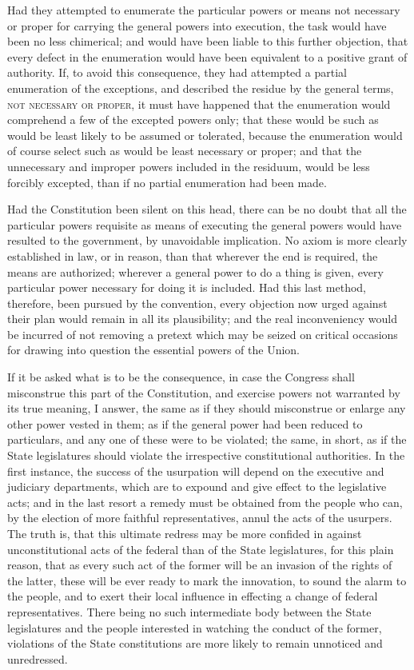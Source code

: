 Had they attempted to enumerate the particular powers or means not necessary or proper for carrying the general powers into execution, the task would have been no less chimerical; and would have been liable to this further objection, that every defect in the enumeration would have been equivalent to a positive grant of authority. 
If, to avoid this consequence, they had attempted a partial enumeration of the exceptions, and described the residue by the general terms, \textsc{not necessary or proper}, it must have happened that the enumeration would comprehend a few of the excepted powers only; that these would be such as would be least likely to be assumed or tolerated, because the enumeration would of course select such as would be least necessary or proper; and that the unnecessary and improper powers included in the residuum, would be less forcibly excepted, than if no partial enumeration had been made.

Had the Constitution been silent on this head, there can be no doubt that all the particular powers requisite as means of executing the general powers would have resulted to the government, by unavoidable implication. 
No axiom is more clearly established in law, or in reason, than that wherever the end is required, the means are authorized; wherever a general power to do a thing is given, every particular power necessary for doing it is included. 
Had this last method, therefore, been pursued by the convention, every objection now urged against their plan would remain in all its plausibility; and the real inconveniency would be incurred of not removing a pretext which may be seized on critical occasions for drawing into question the essential powers of the Union.

If it be asked what is to be the consequence, in case the Congress shall misconstrue this part of the Constitution, and exercise powers not warranted by its true meaning, I answer, the same as if they should misconstrue or enlarge any other power vested in them; as if the general power had been reduced to particulars, and any one of these were to be violated; the same, in short, as if the State legislatures should violate the irrespective constitutional authorities. 
In the first instance, the success of the usurpation will depend on the executive and judiciary departments, which are to expound and give effect to the legislative acts; and in the last resort a remedy must be obtained from the people who can, by the election of more faithful representatives, annul the acts of the usurpers. 
The truth is, that this ultimate redress may be more confided in against unconstitutional acts of the federal than of the State legislatures, for this plain reason, that as every such act of the former will be an invasion of the rights of the latter, these will be ever ready to mark the innovation, to sound the alarm to the people, and to exert their local influence in effecting a change of federal representatives. 
There being no such intermediate body between the State legislatures and the people interested in watching the conduct of the former, violations of the State constitutions are more likely to remain unnoticed and unredressed.

